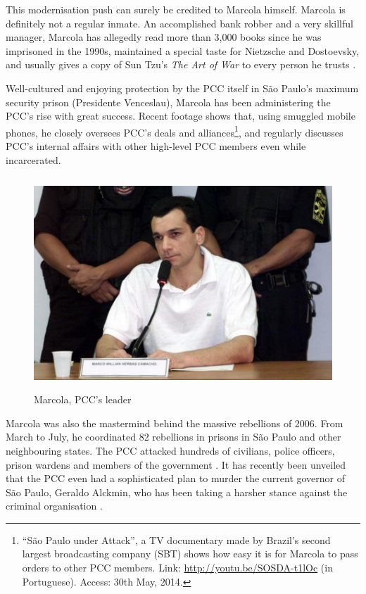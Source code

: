 This modernisation push can surely be credited to Marcola himself. Marcola is definitely not a regular inmate. An accomplished bank robber and a very skillful manager, Marcola has allegedly read more than 3,000 books since he was imprisoned in the 1990s, maintained a special taste for Nietzsche and Dostoevsky, and usually gives a copy of Sun Tzu's \textit{The Art of War} to every person he trusts \citep[]{epoca2005marcola}. 

Well-cultured and enjoying protection by the PCC itself in S\~{a}o Paulo's maximum security prison (Presidente Venceslau), Marcola has been administering the PCC's rise with great success. Recent footage shows that, using smuggled mobile phones, he closely oversees PCC's deals and alliances\footnote{``S\~{a}o Paulo under Attack'', a TV documentary made by Brazil's second largest broadcasting company (SBT) shows how easy it is for Marcola to pass orders to other PCC members. Link: \href{http://youtu.be/SOSDA-t1lOc}{http://youtu.be/SOSDA-t1lOc} (in Portuguese). Access: 30th May, 2014.}, and regularly discusses PCC's internal affairs with other high-level PCC members even while incarcerated.

\begin{center}
\begin{figure}[bth!]
\includegraphics[height = 8cm, width = 1\linewidth]{gfx/fig6}
\caption[Marcola, PCC's leader]{Marcola, PCC's leader\footnotemark}
\label{fig:fig6}
\end{figure}
\end{center}

Marcola was also the mastermind behind the massive rebellions of 2006. From March to July, he coordinated 82 rebellions in prisons in S\~{a}o Paulo and other neighbouring states. The PCC attacked hundreds of civilians, police officers, prison wardens and members of the government \citep[]{folha2006rebeliao, terra2008rebeliao}. It has recently been unveiled that the PCC even had a sophisticated plan to murder the current governor of S\~{a}o Paulo, Geraldo Alckmin, who has been taking a harsher stance against the criminal organisation \citep[]{estadao2013alckmin}. 

